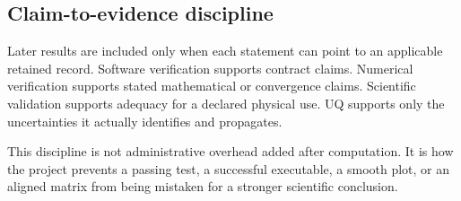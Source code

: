 \subsection{Claim-to-evidence discipline}


Later results are included only when each statement can point to an applicable
retained record. Software verification supports contract claims. Numerical
verification supports stated mathematical or convergence claims. Scientific
validation supports adequacy for a declared physical use. UQ supports only the
uncertainties it actually identifies and propagates.

This discipline is not administrative overhead added after computation. It is
how the project prevents a passing test, a successful executable, a smooth plot,
or an aligned matrix from being mistaken for a stronger scientific conclusion.

